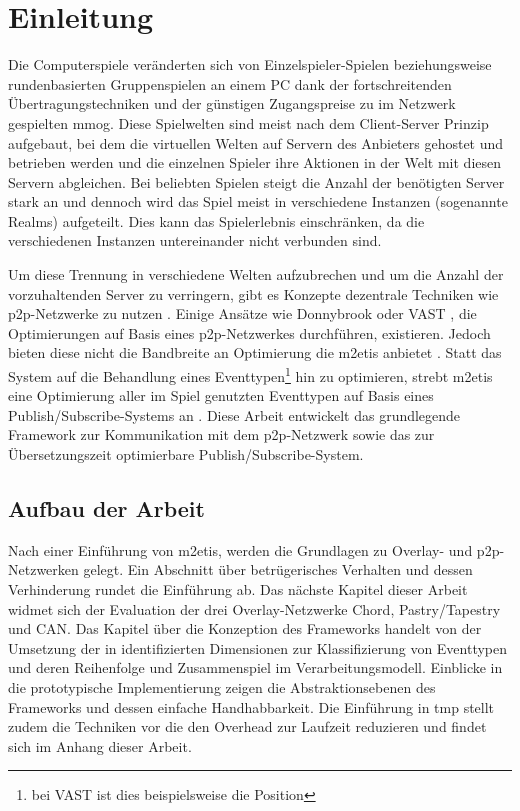 \chapter{Einleitung}
\label{chap:einleitung}
Die Computerspiele veränderten sich von Einzelspieler-Spielen beziehungsweise rundenbasierten Gruppenspielen an einem PC dank der fortschreitenden Übertragungstechniken und der günstigen Zugangspreise zu im Netzwerk gespielten \ac{mmog}. Diese Spielwelten sind meist nach dem Client-Server Prinzip aufgebaut, bei dem die virtuellen Welten auf Servern des Anbieters gehostet und betrieben werden und die einzelnen Spieler ihre Aktionen in der Welt mit diesen Servern abgleichen. Bei beliebten Spielen steigt die Anzahl der benötigten Server stark an und dennoch wird das Spiel meist in verschiedene Instanzen (sogenannte Realms) aufgeteilt. Dies kann das Spielerlebnis einschränken, da die verschiedenen Instanzen untereinander nicht verbunden sind.

Um diese Trennung in verschiedene Welten aufzubrechen und um die Anzahl der vorzuhaltenden Server zu verringern, gibt es Konzepte dezentrale Techniken wie \ac{p2p}-Netzwerke zu nutzen \cite{Knutsson2004Peertopeer, Triebel2008Peertopeer}. Einige Ansätze wie Donnybrook \cite{Bharambe2008Donnybrook} oder VAST \cite{Backhaus2007Voronoibased}, die Optimierungen auf Basis eines \ac{p2p}-Netzwerkes durchführen, existieren. Jedoch bieten diese nicht die Bandbreite an Optimierung die \ac{m2etis} anbietet \cite{Fischer2010Event}. Statt das System auf die Behandlung eines Eventtypen\footnote{bei VAST ist dies beispielsweise die Position} hin zu optimieren, strebt \ac{m2etis} eine Optimierung aller im Spiel genutzten Eventtypen auf Basis eines Publish/Subscribe-Systems an \cite{Fischer2010a}. Diese Arbeit entwickelt das grundlegende Framework zur Kommunikation mit dem \ac{p2p}-Netzwerk sowie das zur Übersetzungszeit optimierbare Publish/Subscribe-System.

\section{Aufbau der Arbeit}
Nach einer Einführung von \ac{m2etis}, werden die Grundlagen zu Overlay- und p2p-Netzwerken gelegt. Ein Abschnitt über betrügerisches Verhalten und dessen Verhinderung rundet die Einführung ab. Das nächste Kapitel dieser Arbeit widmet sich der Evaluation der drei Overlay-Netzwerke Chord, Pastry/Tapestry und CAN. Das Kapitel über die Konzeption des Frameworks handelt von der Umsetzung der in \cite{Fischer2010Event} identifizierten Dimensionen zur Klassifizierung von Eventtypen und deren Reihenfolge und Zusammenspiel im Verarbeitungsmodell. Einblicke in die prototypische Implementierung zeigen die Abstraktionsebenen des Frameworks und dessen einfache Handhabbarkeit. Die Einführung in \ac{tmp} stellt zudem die Techniken vor die den Overhead zur Laufzeit reduzieren und findet sich im Anhang dieser Arbeit.
